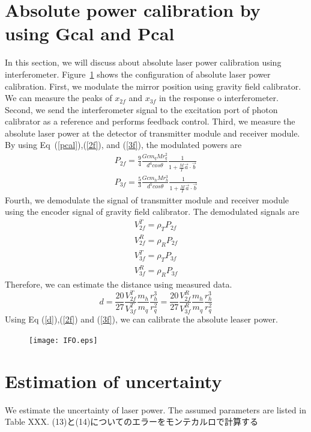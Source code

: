 \documentclass[12pt]{iopart}
\begin{document}
\section{Absolute power calibration by using Gcal and Pcal}
In this section, we will discuss about absolute laser power calibration using interferometer. 
Figure~\ref{fig:IFO} shows the configuration of absolute laser power calibration.
First, we modulate the mirror position using gravity field calibrator. We can measure the peaks of $x_{2f}$ and $x_{3f}$ in the response o interferometer. Second, we send the interferometer signal to the excitation port of photon calibrator as a reference and performs feedback control. Third, we measure the absolute laser power at the detector of transmitter module and receiver module. By using Eq~(\ref{pcal}),(\ref{2f}), and (\ref{3f}), the modulated powers are
\begin{eqnarray}
 P_{2f}=\frac{9}{4} \frac{Gcm_{q}Mr_{q}^2}{d^4cos\theta}\frac{1}{1+\frac{M}{I}\vec{a}\cdot \vec{b}} \label{2f} \\
 P_{3f}= \frac{5}{3} \frac{Gcm_{h}Mr_{h}^3}{d^5cos\theta}\frac{1}{1+\frac{M}{I}\vec{a}\cdot \vec{b}} \label{3f}
\end{eqnarray}
Fourth, we demodulate the signal of transmitter module and receiver module using the encoder signal of gravity field calibrator.
The demodulated signals are 
\begin{eqnarray}
V_{2f}^{T}=\rho_{T}P_{2f} \\
V_{2f}^{R}=\rho_{R}P_{2f} \\
V_{3f}^{T}=\rho_{T}P_{3f} \\
V_{3f}^{R}=\rho_{R}P_{3f} 
\end{eqnarray} 
Therefore, we can estimate the distance using measured data. 
\begin{equation}
d=\frac{20}{27} \frac{V_{2f}^T}{V_{3f}^T}\frac{m_{h}}{m_{q}}\frac{r_{h}^{3}}{r_{q}^{2}}=\frac{20}{27} \frac{V_{2f}^R}{V_{3f}^R}\frac{m_{h}}{m_{q}}\frac{r_{h}^{3}}{r_{q}^{2}} \label{d}
\end{equation}
Using Eq (\ref{d}),(\ref{2f}) and (\ref{3f}), we can calibrate the absolute leaser power.

\begin{figure}
\begin{center}
\texttt{[image: IFO.eps]}
\caption{}
\label{fig:IFO}
\end{center}
\end{figure}

\section{Estimation of uncertainty}
We estimate the uncertainty of laser power. The assumed parameters are listed in Table XXX. (13)と(14)についてのエラーをモンテカルロで計算する
\end{document}
